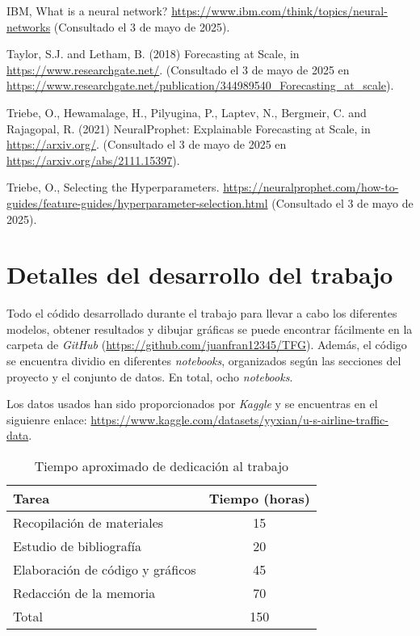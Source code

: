 \documentclass[12pt,twoside]{article}
\begin{document}
\begin{thebibliography}{100}
IBM, What is a neural network? \url{https://www.ibm.com/think/topics/neural-networks} (Consultado el 3 de mayo de 2025).

Taylor, S.J. and Letham, B. (2018) Forecasting at Scale, in \url{https://www.researchgate.net/}. (Consultado el 3 de mayo de 2025 en \url{https://www.researchgate.net/publication/344989540_Forecasting_at_scale}).

Triebe, O., Hewamalage, H., Pilyugina, P., Laptev, N., Bergmeir, C. and Rajagopal, R. (2021) NeuralProphet: Explainable Forecasting at Scale, in \url{https://arxiv.org/}. (Consultado el 3 de mayo de 2025 en \url{https://arxiv.org/abs/2111.15397}).

Triebe, O., Selecting the Hyperparameters. \url{https://neuralprophet.com/how-to-guides/feature-guides/hyperparameter-selection.html} (Consultado el 3 de mayo de 2025).

\end{thebibliography}

\newpage
\appendix

\section{Detalles del desarrollo del trabajo}
Todo el códido desarrollado durante el trabajo para llevar a cabo los diferentes modelos, obtener resultados y dibujar gráficas se puede encontrar fácilmente en la carpeta de \textit{GitHub} (\url{https://github.com/juanfran12345/TFG}). Además, el código se encuentra dividio en diferentes \textit{notebooks}, organizados según las secciones del proyecto y el conjunto de datos. En total, ocho \textit{notebooks}.

Los datos usados han sido proporcionados por \textit{Kaggle} y se encuentras en el siguienre enlace: \href{https://www.kaggle.com/datasets/yyxian/u-s-airline-traffic-data}{https://www.kaggle.com/datasets/yyxian/u-s-airline-traffic-data}.

\begin{table}[ht] 
\centering
\begin{tabular}{lc} 
  \hline
 Tarea & Tiempo (horas) \\ 
  \hline
Recopilación de materiales &   15 \\ 
Estudio de bibliografía &   20 \\ 
Elaboración de código y gráficos &  45 \\ 
Redacción de la memoria &  70 \\
 \hline
Total & 150\\
\hline
\end{tabular}
\caption{Tiempo aproximado de dedicación al trabajo} \label{tab{02}}
\end{table}
\end{document}
